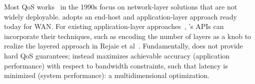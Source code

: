  Most QoS works~\cite{ferrari1990scheme, shenker1994integrated,
  shenker1995fundamental} in the 1990s focus on network-layer solutions that are
not widely deployable. \sysname{} adopts an end-host and application-layer
approach ready today for WAN. For existing application-layer
approaches~\cite{vandalore2001survey}, \sysname{}'s APIs can incorporate their
techniques, such as encoding the number of layers as a knob to realize the
layered approach in Rejaie et al~\cite{rejaie2000layered}. Fundamentally,
\sysname{} does not provide hard QoS guarantees; instead \sysname{} maximizes
achievable accuracy (application performance) with respect to bandwidth
constraints, such that latency is minimized (system performance): a
multidimensional optimization.




